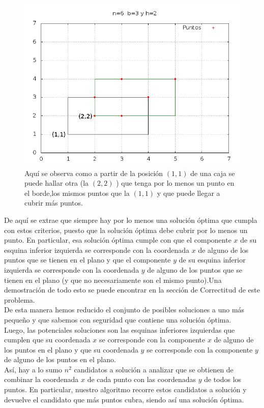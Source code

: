 \begin{figure}[H]
	\centering
	\includegraphics[scale=0.6]{ej3-grafico2.png}
	\caption{ Aqu\'i se observa como a partir de la posici\'on $(1,1)$ de una caja se puede hallar otra (la $(2,2)$ ) que tenga por lo menos un punto en el borde,los mismos puntos que la $(1,1)$ y que puede llegar a cubrir m\'as puntos. }
\end{figure}


\indent  De aqu\'i se extrae que siempre hay por lo menos una solución \'optima que cumpla con estos criterios, puesto que la soluci\'on \'optima debe cubrir por lo menos un punto. En particular, esa soluci\'on \'optima cumple con que el componente $x$ de su esquina inferior izquierda se corresponde con la coordenada $x$ de alguno de los puntos que se tienen en el plano y que el componente $y$ de su esquina inferior izquierda se corresponde con la coordenada $y$ de alguno de los puntos que se tienen en el plano (y que no necesariamente son el mismo punto).Una demostraci\'on de todo esto se puede encontrar en la secci\'on de Correctitud de este problema.\\
\indent De esta manera hemos reducido el conjunto de posibles soluciones a uno m\'as pequeño y que sabemos con seguridad que contiene una soluci\'on \'optima.\\ 
\indent Luego, las potenciales soluciones son las esquinas inferiores izquierdas que cumplen que su coordenada $x$ se corresponde con la componente $x$ de alguno de los puntos en el plano y que su coordenada $y$ se corresponde con la componente $y$ de alguno de los puntos en el plano.\\
\indent As\'i, hay a lo sumo $n^{2}$ candidatos a soluci\'on a analizar que se obtienen de combinar la coordenada $x$ de cada punto con las coordenadas $y$ de todos los puntos. En particular, nuestro algoritmo recorre estos candidatos a soluci\'on y devuelve el candidato que m\'as puntos cubra, siendo as\'i una soluci\'on \'optima.\\

